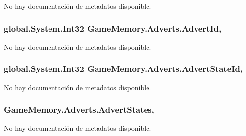 No hay documentación de metadatos disponible. 

\hypertarget{class_game_memory_1_1_adverts_ae0e7ff2ba8cd7a48717cd4b26a7927f1}{
\subsubsection[{Advert\-Id}]{\setlength{\rightskip}{0pt plus 5cm}global.\-System.\-Int32 Game\-Memory.\-Adverts.\-Advert\-Id\hspace{0.3cm}{\ttfamily [get]}, {\ttfamily [set]}}}\label{class_game_memory_1_1_adverts_ae0e7ff2ba8cd7a48717cd4b26a7927f1}


No hay documentación de metadatos disponible. 

\hypertarget{class_game_memory_1_1_adverts_a76a43f9edd08d0588a03cb95d6be0bcf}{
\subsubsection[{Advert\-State\-Id}]{\setlength{\rightskip}{0pt plus 5cm}global.\-System.\-Int32 Game\-Memory.\-Adverts.\-Advert\-State\-Id\hspace{0.3cm}{\ttfamily [get]}, {\ttfamily [set]}}}\label{class_game_memory_1_1_adverts_a76a43f9edd08d0588a03cb95d6be0bcf}


No hay documentación de metadatos disponible. 

\hypertarget{class_game_memory_1_1_adverts_ac01d784c797e36812eb383f4920bb276}{
\subsubsection[{Advert\-States}]{ Game\-Memory.\-Adverts.\-Advert\-States\hspace{0.3cm}{\ttfamily [get]}, {\ttfamily [set]}}}\label{class_game_memory_1_1_adverts_ac01d784c797e36812eb383f4920bb276}


No hay documentación de metadatos disponible. 

